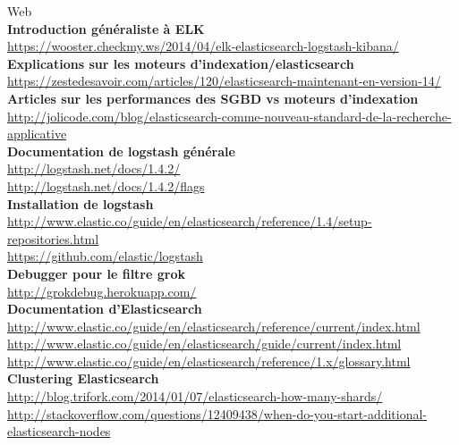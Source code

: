 {\huge Web}\\[5mm]

\textbf{Introduction généraliste à ELK} \\
\url{https://wooster.checkmy.ws/2014/04/elk-elasticsearch-logstash-kibana/}\\[1mm]

\textbf{Explications sur les moteurs d'indexation/elasticsearch}\\
\url{https://zestedesavoir.com/articles/120/elasticsearch-maintenant-en-version-14/}\\[1mm]

\textbf{Articles sur les performances des SGBD vs moteurs d'indexation}\\
{\footnotesize \url{http://jolicode.com/blog/elasticsearch-comme-nouveau-standard-de-la-recherche-applicative}}\\[1mm]


\textbf{Documentation de logstash générale}\\
\url{http://logstash.net/docs/1.4.2/}\\
\url{http://logstash.net/docs/1.4.2/flags}\\[1mm]

\textbf{Installation de logstash}\\
{\footnotesize \url{http://www.elastic.co/guide/en/elasticsearch/reference/1.4/setup-repositories.html}}\\
\url{https://github.com/elastic/logstash}\\[1mm]

\textbf{Debugger pour le filtre grok}\\
\url{http://grokdebug.herokuapp.com/}\\[1mm]

\textbf{Documentation d'Elasticsearch}\\
\url{http://www.elastic.co/guide/en/elasticsearch/reference/current/index.html}\\
\url{http://www.elastic.co/guide/en/elasticsearch/guide/current/index.html}\\
\url{http://www.elastic.co/guide/en/elasticsearch/reference/1.x/glossary.html}\\[1mm]

\textbf{Clustering Elasticsearch}\\
\url{http://blog.trifork.com/2014/01/07/elasticsearch-how-many-shards/}\\
{\footnotesize \url{http://stackoverflow.com/questions/12409438/when-do-you-start-additional-elasticsearch-nodes}}\\[1mm]


